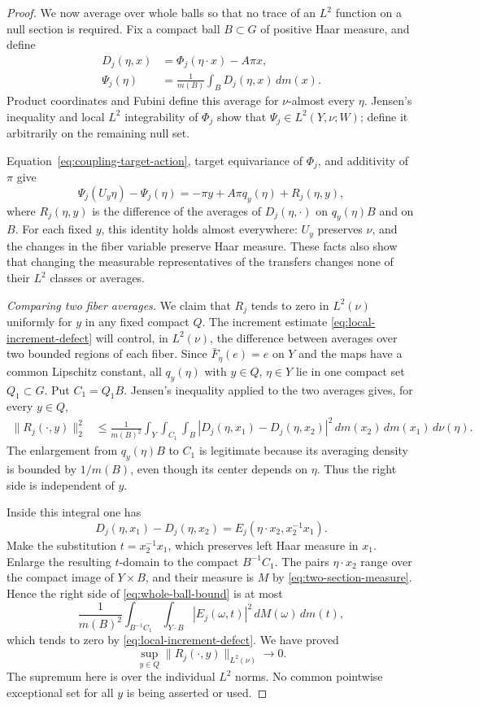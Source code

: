 \begin{proof}
We now average over whole balls so that no trace of an $L^2$ function
on a null section is required.  Fix a compact ball $B\subset G$
of positive Haar measure, and define
\begin{align*}
 D_j(\eta,x)&=\Phi_j(\eta\cdot x)-A\pi x,\\
 \Psi_j(\eta)&=\frac1{m(B)}\int_B D_j(\eta,x)\,dm(x).
\end{align*}
Product coordinates and Fubini define this average for $\nu$-almost
every $\eta$.  Jensen's inequality and local $L^2$ integrability of
$\Phi_j$ show that $\Psi_j\in L^2(Y,\nu;W)$; define it arbitrarily
on the remaining null set.

Equation~\eqref{eq:coupling-target-action}, target equivariance of
$\Phi_j$, and additivity of $\pi$ give
\begin{equation}\label{eq:inverse-transfer-identity}
 \Psi_j(U_y\eta)-\Psi_j(\eta)
 =-\pi y+A\pi q_y(\eta)+R_j(\eta,y),
\end{equation}
where $R_j(\eta,y)$ is the difference of the averages of
$D_j(\eta,\cdot)$ on $q_y(\eta)B$ and on $B$.
For each fixed $y$, this identity holds almost everywhere:
$U_y$ preserves $\nu$, and the changes in the fiber variable preserve
Haar measure.  These facts also show that changing the measurable
representatives of the transfers changes none of their $L^2$ classes
or averages.

\emph{Comparing two fiber averages.}
We claim that $R_j$ tends to zero in $L^2(\nu)$ uniformly for $y$
in any fixed compact $Q$.  The increment estimate
\eqref{eq:local-increment-defect} will control, in $L^2(\nu)$, the
difference between averages over two bounded regions of each fiber.  Since
$\bar F_\eta(e)=e$ on $Y$ and the
maps have a common Lipschitz constant, all $q_y(\eta)$ with
$y\in Q$, $\eta\in Y$ lie in one compact set $Q_1\subset G$.
Put $C_1=Q_1B$.  Jensen's inequality applied to the two averages
gives, for every $y\in Q$,
\begin{align}
 \|R_j(\cdot,y)\|_2^2
 &\le \frac1{m(B)^2}
 \int_Y\int_{C_1}\int_B
 |D_j(\eta,x_1)-D_j(\eta,x_2)|^2\,
 dm(x_2)\,dm(x_1)\,d\nu(\eta).
 \label{eq:whole-ball-bound}
\end{align}
The enlargement from $q_y(\eta)B$ to $C_1$ is legitimate because
its averaging density is bounded by $1/m(B)$, even though its center
depends on $\eta$.  Thus the right side is independent of $y$.

Inside this integral one has
\[
 D_j(\eta,x_1)-D_j(\eta,x_2)
   =E_j(\eta\cdot x_2,x_2^{-1}x_1).
\]
Make the substitution $t=x_2^{-1}x_1$, which preserves left Haar
measure in $x_1$.  Enlarge the resulting $t$-domain to the compact
$B^{-1}C_1$.  The pairs $\eta\cdot x_2$ range over the compact
image of $Y\times B$, and their measure is $M$ by
\eqref{eq:two-section-measure}.  Hence the right side of
\eqref{eq:whole-ball-bound} is at most
\[
 \frac1{m(B)^2}\int_{B^{-1}C_1}
 \int_{Y\cdot B}|E_j(\omega,t)|^2\,dM(\omega)\,dm(t),
\]
which tends to zero by \eqref{eq:local-increment-defect}.
We have proved
\[
 \sup_{y\in Q}\|R_j(\cdot,y)\|_{L^2(\nu)}\longrightarrow0.
\]
The supremum here is over the individual $L^2$ norms.  No common
pointwise exceptional set for all $y$ is being asserted or used.


\end{proof}
